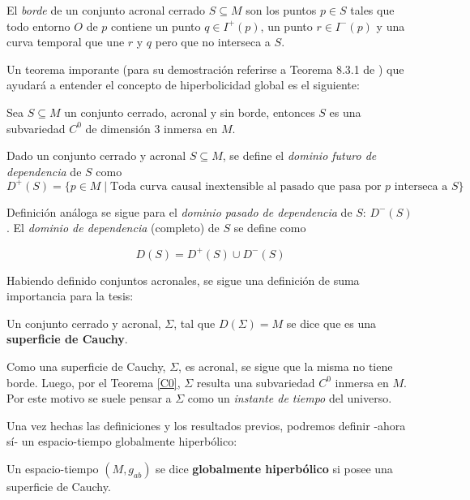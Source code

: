 \begin{definition}
El \textit{borde} de un conjunto acronal cerrado $S\subseteq M$ son los puntos $p\in S$ tales que todo entorno $O$ de $p$ contiene un punto $q\in I^+(p)$, un punto $r\in I^-(p)$ y una curva temporal que une $r$ y $q$ pero que no interseca a $S$. 
\end{definition}

Un teorema imporante (para su demostración referirse a Teorema 8.3.1 de \citep{1984ucp..book.....W}) que ayudará a entender el concepto de hiperbolicidad global es el siguiente:

\begin{theorem}\label{C0}
Sea $S\subseteq M$ un conjunto cerrado, acronal y sin borde, entonces $S$ es una subvariedad $C^0$ de dimensión $3$ inmersa en $M$. 
\end{theorem}


\begin{definition}
Dado un conjunto cerrado y acronal $S\subseteq M$, se define el \textit{dominio futuro de dependencia} de $S$ como 
\[ D^+(S)=\{p\in M \mid \text{Toda curva causal inextensible al pasado que pasa por $p$ interseca a $S$\}} \]
\end{definition}

Definición análoga se sigue para el \textit{dominio pasado de dependencia} de $S$: $D^-(S)$. El \textit{dominio de dependencia} (completo) de $S$ se define como 

\[ D(S)=D^+(S)\cup D^-(S) \]

Habiendo definido conjuntos acronales, se sigue una definición de suma importancia para la tesis:

\begin{definition}
Un conjunto cerrado y acronal, $\Sigma$, tal que $D(\Sigma)=M$ se dice que es una \textbf{superficie de Cauchy}.
\end{definition}

Como una superficie de Cauchy, $\Sigma$, es acronal, se sigue que la misma no tiene borde. Luego, por el Teorema \ref{C0}, $\Sigma$ resulta una subvariedad $C^0$ inmersa en $M$. Por este motivo se suele pensar a $\Sigma$ como un \textit{instante de tiempo} del universo. 

Una vez hechas las definiciones y los resultados previos, podremos definir -ahora sí- un espacio-tiempo globalmente hiperbólico:

\begin{definition}
Un espacio-tiempo $(M,g_{ab})$ se dice \textbf{globalmente hiperbólico} si posee una superficie de Cauchy.
\end{definition}

